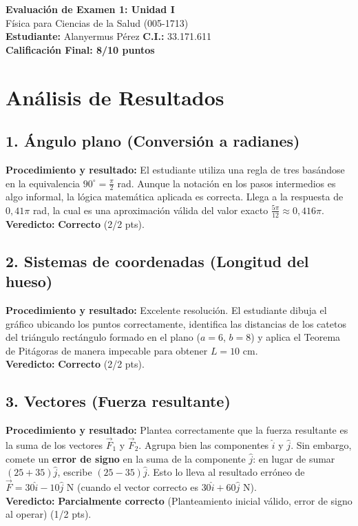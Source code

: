 \documentclass[12pt]{article}
\begin{document}
\begin{center}
    \Large \textbf{Evaluación de Examen 1: Unidad I} \\
    \large Física para Ciencias de la Salud (005-1713) \\
    \vspace{0.5cm}
    \textbf{Estudiante:} Alanyermus Pérez \quad \textbf{C.I.:} 33.171.611
    \vspace{0.3cm} \\
    \large \textbf{Calificación Final: 8/10 puntos}
\end{center}

\vspace{0.5cm}

\section*{Análisis de Resultados}

\subsection*{1. Ángulo plano (Conversión a radianes)}
\textbf{Procedimiento y resultado:} El estudiante utiliza una regla de tres basándose en la equivalencia $90^\circ = \frac{\pi}{2}$ rad. Aunque la notación en los pasos intermedios es algo informal, la lógica matemática aplicada es correcta. Llega a la respuesta de $0,41\pi$ rad, la cual es una aproximación válida del valor exacto $\frac{5\pi}{12} \approx 0,416\pi$. \\
\textbf{Veredicto:} \textbf{Correcto} (2/2 pts).

\subsection*{2. Sistemas de coordenadas (Longitud del hueso)}
\textbf{Procedimiento y resultado:} Excelente resolución. El estudiante dibuja el gráfico ubicando los puntos correctamente, identifica las distancias de los catetos del triángulo rectángulo formado en el plano ($a=6$, $b=8$) y aplica el Teorema de Pitágoras de manera impecable para obtener $L = 10$ cm. \\
\textbf{Veredicto:} \textbf{Correcto} (2/2 pts).

\subsection*{3. Vectores (Fuerza resultante)}
\textbf{Procedimiento y resultado:} Plantea correctamente que la fuerza resultante es la suma de los vectores $\vec{F}_1$ y $\vec{F}_2$. Agrupa bien las componentes $\hat{i}$ y $\hat{j}$. Sin embargo, comete un \textbf{error de signo} en la suma de la componente $\hat{j}$: en lugar de sumar $(25 + 35)\hat{j}$, escribe $(25 - 35)\hat{j}$. Esto lo lleva al resultado erróneo de $\vec{F} = 30\hat{i} - 10\hat{j}$ N (cuando el vector correcto es $30\hat{i} + 60\hat{j}$ N). \\
\textbf{Veredicto:} \textbf{Parcialmente correcto} (Planteamiento inicial válido, error de signo al operar) (1/2 pts).
\end{document}
